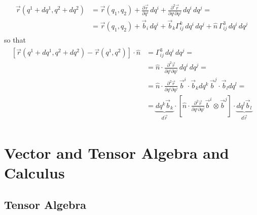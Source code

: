 \documentclass[letterpaper,10pt,english]{jupyterBook}
\begin{document}
\sphinxAtStartPar
{}
\begin{equation*}
\begin{split}\begin{aligned}
  \vec{r}(q^1 + d q^1, q^2 + d q^2) 
  & = \vec{r}(q_1, q_2) + \frac{\partial \vec{r}}{\partial q^i} \, dq^i + \frac{\partial^2 \vec{r}}{\partial q^i \partial q^j} \, dq^i \, dq^j = \\
  & = \vec{r}(q_1, q_2) + \vec{b}_{i} \, dq^i + \vec{b}_k \Gamma^{k}_{ij} \, dq^i \, dq^j +  \hat{n} \, \Gamma^{3}_{ij} \, dq^i \, dq^j 
\end{aligned}\end{split}
\end{equation*}
\sphinxAtStartPar
so that
\begin{equation*}
\begin{split}\begin{aligned}
\left[ \vec{r}(q^1 + d q^1, q^2 + d q^2) - \vec{r}(q^1, q^2) \right] \cdot \hat{n} 
 & = \Gamma^3_{ij} \, d q^i \, dq^j = \\
 & = \hat{n} \cdot \frac{\partial^2 \vec{r}}{\partial q^i \partial q^j} \, d q^i \, dq^j = \\
 & = \hat{n} \cdot \frac{\partial^2 \vec{r}}{\partial q^i \partial q^j} \, \vec{b}^i \cdot \vec{b}_k d q^k \, \vec{b}^j \cdot \vec{b}_l dq^l = \\
 & = \underbrace{d q^k \vec{b}_k}_{d \vec{r}} \cdot \left[ \hat{n} \cdot \frac{\partial^2 \vec{r}}{\partial q^i \partial q^j}  \vec{b}^i \otimes \vec{b}^j \right] \cdot \underbrace{d q^l \vec{b}_l}_{d\vec{r}}
\end{aligned}\end{split}
\end{equation*}
\sphinxAtStartPar
{}

\sphinxstepscope


\part{Vector and Tensor Algebra and Calculus}

\sphinxstepscope


\chapter{Tensor Algebra}
\label{\detokenize{ch/tensor-algebra-calculus/algebra:tensor-algebra}}\label{\detokenize{ch/tensor-algebra-calculus/algebra:id1}}\label{\detokenize{ch/tensor-algebra-calculus/algebra::doc}}
\end{document}
